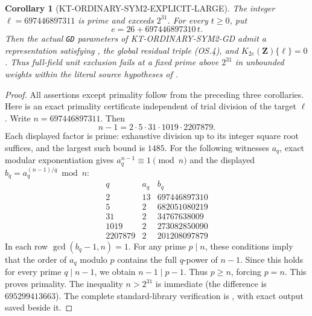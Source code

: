 \documentclass[11pt,a4paper]{article}
\newtheorem{corollary}[theorem]{Corollary}
\theoremstyle{definition}
\begin{document}
\begin{corollary}[KT-ORDINARY-SYM2-EXPLICIT-LARGE]
The integer $\ell=697446897311$ is prime and exceeds
$2^{31}$. For every $t\geq0$, put
\[
                  e=26+697446897310\,t.
\]
Then the actual \texttt{GD} parameters of
KT-ORDINARY-SYM2-GD admit a representation satisfying
, the global residual triple (OS.4),
and $K_{2e}(\mathbf Z)\{\ell\}=0$.
Thus full-field unit exclusion fails at a fixed prime
above $2^{31}$ in unbounded weights within the literal
source hypotheses of .
\end{corollary}
\begin{proof}
All assertions except primality follow from the preceding
three corollaries. Here is an exact primality certificate
independent of trial division of the target $\ell$.
Write $n=697446897311$. Then
\[
              n-1=2\cdot5\cdot31\cdot1019\cdot2207879.
\]
Each displayed factor is prime: exhaustive division up to
its integer square root suffices, and the largest such
bound is $1485$. For the following witnesses $a_q$, exact
modular exponentiation gives $a_q^{n-1}\equiv1\pmod n$
and the displayed $b_q=a_q^{(n-1)/q}\bmod n$:
\[
\begin{array}{r|r|r}
q&a_q&b_q\\\hline
2&13&697446897310\\
5&2&682051080219\\
31&2&34767638009\\
1019&2&273082850090\\
2207879&2&201208097879
\end{array}
\]
In each row $\gcd(b_q-1,n)=1$.
For any prime $p\mid n$, these conditions imply that the
order of $a_q$ modulo $p$ contains the full $q$-power of
$n-1$. Since this holds for every prime $q\mid n-1$,
we obtain $n-1\mid p-1$. Thus $p\geq n$, forcing $p=n$.
This proves primality. The inequality $n>2^{31}$ is
immediate (the difference is $695299413663$).
The complete standard-library verification is
, with
exact output saved beside it.
\end{proof}
\end{document}
